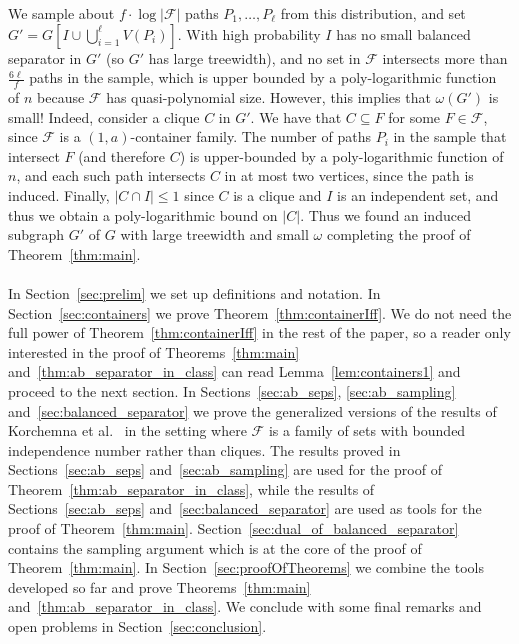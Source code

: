 \documentclass[11pt]{amsart}
\newcommand{\cal}{\mathcal}
\begin{document}
We sample about $f \cdot \log |{\cal F}|$ paths $P_1, \ldots, P_\ell$ from this distribution, and set $G' = G[I \cup \bigcup_{i=1}^\ell V(P_i)]$. With high probability $I$ has no small balanced separator in $G'$ (so $G'$ has large treewidth), and no set in ${\cal F}$ intersects more than $\frac{6\ell}{f}$ paths in the sample, which is upper bounded by a poly-logarithmic function of $n$ because ${\cal F}$ has quasi-polynomial size. 
%
However, this implies that $\omega(G')$ is small! Indeed, consider a clique $C$ in $G'$. We have that $C \subseteq F$ for some $F \in {\cal F}$, since ${\cal F}$ is a $(1, a)$-container family.
The number of  paths $P_i$ in the sample that intersect $F$ (and therefore $C$) is upper-bounded by a poly-logarithmic function of $n$, and each such path intersects $C$ in at most two vertices, since the path is induced. Finally, $|C \cap I| \leq 1$ since $C$ is a clique and $I$ is an independent set, and thus we obtain 
a poly-logarithmic bound on  $|C|$. Thus we found an induced subgraph $G'$ of $G$ with large treewidth and small $\omega$ completing the proof of Theorem~\ref{thm:main}.
\\
\\
In Section~\ref{sec:prelim} we set up definitions and notation. 
%
In Section~\ref{sec:containers} we prove Theorem~\ref{thm:containerIff}. We do not need the full power of Theorem~\ref{thm:containerIff} in the rest of the paper, so a reader only interested in the proof of Theorems~\ref{thm:main} and~\ref{thm:ab_separator_in_class} can read Lemma~\ref{lem:containers1} and proceed to the next section. 
%
In Sections~\ref{sec:ab_seps}, \ref{sec:ab_sampling} and~\ref{sec:balanced_separator} we prove the generalized versions of the results of Korchemna et al.~\cite{KorchemnaL0S024} in the setting where ${\cal F}$ is a family of sets with bounded independence number rather than cliques. 
%
The results proved in Sections~\ref{sec:ab_seps} and~\ref{sec:ab_sampling} are used for the proof of Theorem~\ref{thm:ab_separator_in_class}, while the results of Sections~\ref{sec:ab_seps} and~\ref{sec:balanced_separator} are used as tools for the proof of Theorem~\ref{thm:main}.
%
Section~\ref{sec:dual_of_balanced_separator} contains the sampling argument which is at the core of the proof of Theorem~\ref{thm:main}. In Section~\ref{sec:proofOfTheorems} we combine the tools  developed so far and prove Theorems~\ref{thm:main} and~\ref{thm:ab_separator_in_class}.
%
We conclude with some final remarks and open problems in Section~\ref{sec:conclusion}.
\end{document}
